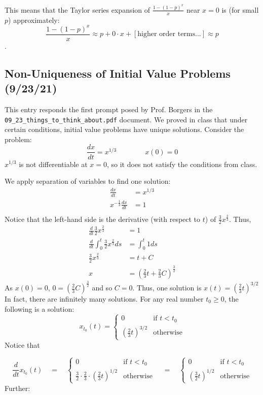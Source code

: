 \documentclass[12pt]{article}
\begin{document}
This means that the Taylor series expansion of $\frac{1-(1-p)^x}{x}$ near $x = 0$ is (for small $p$) approximately:
$$\frac{1-(1-p)^x}{x} \approx p + 0 \cdot x + [\text{higher order terms...}] \approx p$$.

\subsection{Non-Uniqueness of Initial Value Problems (9/23/21)}
This entry responds the first prompt posed by Prof. Borgers in the \texttt{09\_23\_things\_to\_think\_about.pdf} document. We proved in class that under certain conditions, initial value problems have unique solutions. Consider the problem:
$$\frac{dx}{dt} = x^{1/3} \quad\quad\quad\quad x(0) = 0$$
$x^{1/3}$ is not differentiable at $x = 0$, so it does not satisfy the conditions from class.

We apply separation of variables to find one solution:
\begin{align*}
\frac{dx}{dt} &= x^{1/3}\\
x^{-\frac{1}{3}} \frac{dx}{dt} &= 1\\
\end{align*}
Notice that the left-hand side is the derivative (with respect to $t$) of $\frac{3}{2}x^\frac{2}{3}$. Thus,
\begin{align*}
\frac{d}{dt} \frac{3}{2}x^\frac{2}{3} &= 1\\
\frac{d}{dt} \int_0^t \frac{3}{2}x^\frac{2}{3} ds &= \int_0^t 1 ds\\
\frac{3}{2}x^\frac{2}{3} &= t + C\\
x &= \left(\frac{2}{3}t + \frac{2}{3}C \right)^{\frac{3}{2}}
\end{align*}
As $x(0) = 0$, $0 = \left(\frac{2}{3}C \right)^{\frac{3}{2}}$ and so $C = 0$. Thus, one solution is $x(t) = \left(\frac{2}{3}t\right)^{3/2}$\\

In fact, there are infinitely many solutions. For any real number $t_0 \ge 0$, the following is a solution:
$$x_{t_0}(t) = \begin{cases}
0 & \text{if $t < t_0$}\\
\left(\frac{2}{3}t\right)^{3/2} & \text{otherwise}
\end{cases}$$
Notice that 

$$\frac{d}{dt} x_{t_0}(t) \quad = \quad \begin{cases}
0 & \text{if $t < t_0$}\\
\frac{3}{2} \cdot \frac{2}{3} \cdot \left(\frac{2}{3}t\right)^{1/2}  & \text{otherwise}
\end{cases}
\quad = \quad
\begin{cases}
0 & \text{if $t < t_0$}\\
\left(\frac{3}{2}t\right)^{1/2} & \text{otherwise}
\end{cases}$$
Further:
\end{document}

